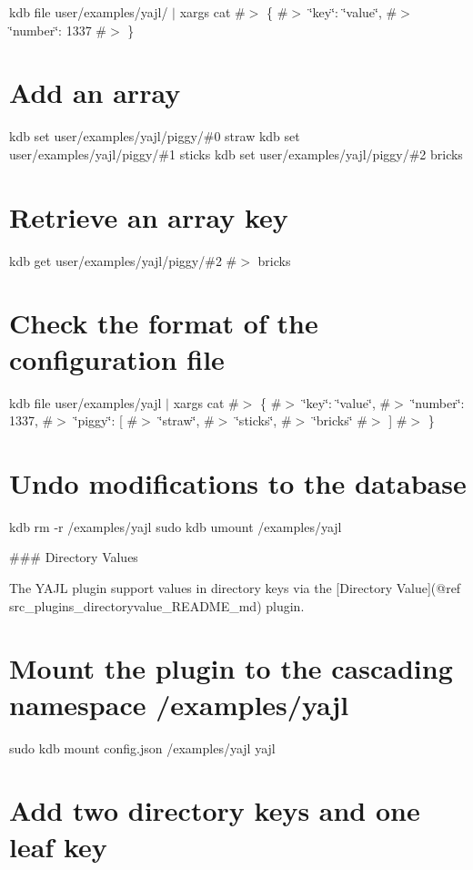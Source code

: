kdb file user/examples/yajl/ $\vert$ xargs cat \#$>$ \{ \#$>$ \char`\"{}key\char`\"{}\+: \char`\"{}value\char`\"{}, \#$>$ \char`\"{}number\char`\"{}\+: 1337 \#$>$ \}

\section*{Add an array}

kdb set user/examples/yajl/piggy/\#0 straw kdb set user/examples/yajl/piggy/\#1 sticks kdb set user/examples/yajl/piggy/\#2 bricks

\section*{Retrieve an array key}

kdb get user/examples/yajl/piggy/\#2 \#$>$ bricks

\section*{Check the format of the configuration file}

kdb file user/examples/yajl $\vert$ xargs cat \#$>$ \{ \#$>$ \char`\"{}key\char`\"{}\+: \char`\"{}value\char`\"{}, \#$>$ \char`\"{}number\char`\"{}\+: 1337, \#$>$ \char`\"{}piggy\char`\"{}\+: \mbox{[} \#$>$ \char`\"{}straw\char`\"{}, \#$>$ \char`\"{}sticks\char`\"{}, \#$>$ \char`\"{}bricks\char`\"{} \#$>$ \mbox{]} \#$>$ \}

\section*{Undo modifications to the database}

kdb rm -\/r /examples/yajl sudo kdb umount /examples/yajl 
\begin{DoxyCode}
### Directory Values

The YAJL plugin support values in directory keys via the [Directory Value](@ref
       src\_plugins\_directoryvalue\_README\_md) plugin.
\end{DoxyCode}
 \section*{Mount the plugin to the cascading namespace {\ttfamily /examples/yajl}}

sudo kdb mount config.\+json /examples/yajl yajl

\section*{Add two directory keys and one leaf key}

